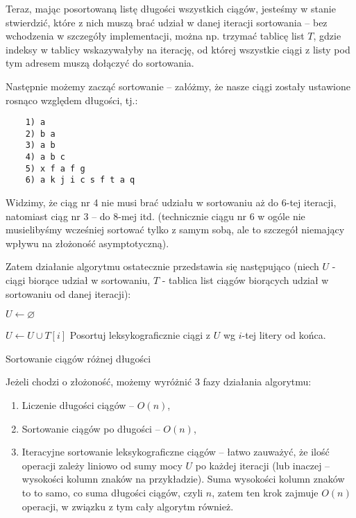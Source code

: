 Teraz, mając posortowaną listę długości wszystkich ciągów, jesteśmy w stanie stwierdzić, które z nich muszą brać udział w danej iteracji sortowania -- bez wchodzenia w szczegóły implementacji, można np. trzymać tablicę list $T$, gdzie indeksy w tablicy wskazywałyby na iterację, od której wszystkie ciągi z listy pod tym adresem muszą dołączyć do sortowania.

Następnie możemy zacząć sortowanie -- załóżmy, że nasze ciągi zostały ustawione rosnąco względem długości, tj.:

\begin{verbatim}
    1) a
    2) b a
    3) a b
    4) a b c
    5) x f a f g
    6) a k j i c s f t a q
\end{verbatim}

Widzimy, że ciąg nr 4 nie musi brać udziału w sortowaniu aż do 6-tej iteracji, natomiast ciąg nr 3 -- do 8-mej itd. (technicznie ciągu nr 6 w ogóle nie musielibyśmy wcześniej sortować tylko z samym sobą, ale to szczegół niemający wpływu na złożoność asymptotyczną).

Zatem działanie algorytmu ostatecznie przedstawia się następująco (niech $U$ - ciągi biorące udział w sortowaniu, $T$ - tablica list ciągów biorących udział w sortowaniu od danej iteracji):

\begin{algorithm}[h]
  \DontPrintSemicolon
  
  $U \leftarrow \varnothing$
  
  {
    {
      $U \leftarrow U \cup T[i]$
    }
    Posortuj leksykograficznie ciągi z $U$ wg $i$-tej litery od końca.
  }
  
  \caption{Sortowanie ciągów różnej długości}
  \label{var-len-sort}
\end{algorithm}

Jeżeli chodzi o złożoność, możemy wyróżnić 3 fazy działania algorytmu:

\begin{enumerate}
    \item Liczenie długości ciągów -- $O(n)$,
    \item Sortowanie ciągów po długości -- $O(n)$,
    \item Iteracyjne sortowanie leksykograficzne ciągów -- łatwo zauważyć, że ilość operacji zależy liniowo od sumy mocy $U$ po każdej iteracji (lub inaczej -- wysokości kolumn znaków na przykładzie). Suma wysokości kolumn znaków to to samo, co suma długości ciągów, czyli $n$, zatem ten krok zajmuje $O(n)$ operacji, w związku z tym cały algorytm również.
\end{enumerate}